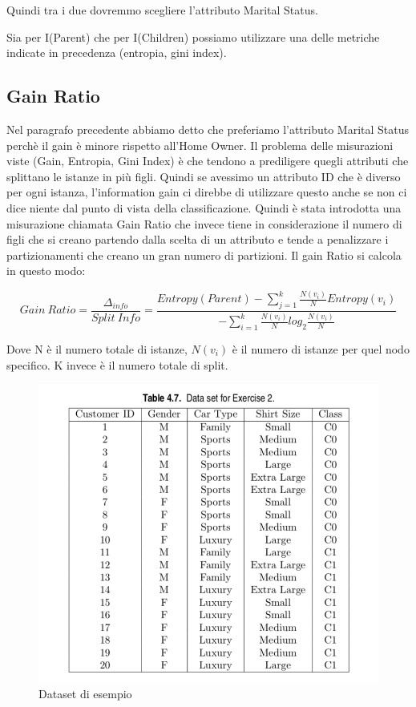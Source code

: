 \documentclass[14pt]{extreport}
\begin{document}
Quindi tra i due dovremmo scegliere l'attributo Marital Status.

Sia per I(Parent) che per I(Children) possiamo utilizzare una delle metriche indicate in precedenza (entropia, gini index).

\subsection{Gain Ratio}

Nel paragrafo precedente abbiamo detto che preferiamo l'attributo Marital Status perchè il gain è minore rispetto all'Home Owner.
Il problema delle misurazioni viste (Gain, Entropia, Gini Index) è che tendono a prediligere quegli attributi che splittano le istanze in più figli. Quindi se avessimo un attributo ID che è diverso per ogni istanza, l'information gain ci direbbe di utilizzare questo anche se non ci dice niente dal punto di vista della classificazione.
Quindi è stata introdotta una misurazione chiamata Gain Ratio che invece tiene in considerazione il numero di figli che si creano partendo dalla scelta di un attributo e tende a penalizzare i partizionamenti che creano un gran numero di partizioni.
Il gain Ratio si calcola in questo modo:

\begin{equation}
    Gain\ Ratio = \frac{\Delta_{info}}{Split\ Info} = \frac{Entropy(Parent) - \sum\limits_{j=1}^{k} \frac {N(v_i)}{N} Entropy(v_i)}{- \sum\limits_{i=1}^{k} \frac{N(v_i)}{N} log_2 \frac {N(v_i)}{N}}
\end{equation}

Dove N è il numero totale di istanze, $N(v_i)$ è il numero di istanze per quel nodo specifico. K invece è il numero totale di split.

\begin{figure}[h!]
  \includegraphics[width=\linewidth]{DatasetMacchine.png}
  \caption{Dataset di esempio}
\end{figure}
\end{document}

